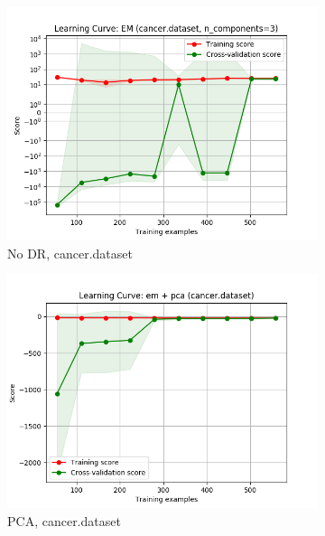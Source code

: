 \documentclass{article}
\begin{document}
    \begin{figure}[htb]
    \centering

      \begin{subfigure}{0.33\textwidth}
        \includegraphics[width=\linewidth]{out/em/cancer-learning.png}
        \caption{No DR, cancer.dataset}
      \end{subfigure}\hfil
      \begin{subfigure}{0.33\textwidth}
        \includegraphics[width=\linewidth]{out/cluster_dr/cancer-em-pca-learning.png}
        \caption{PCA, cancer.dataset}
      \end{subfigure}\hfil
      \begin{subfigure}{0.33\textwidth}

\end{subfigure}
\end{figure}
\end{document}

